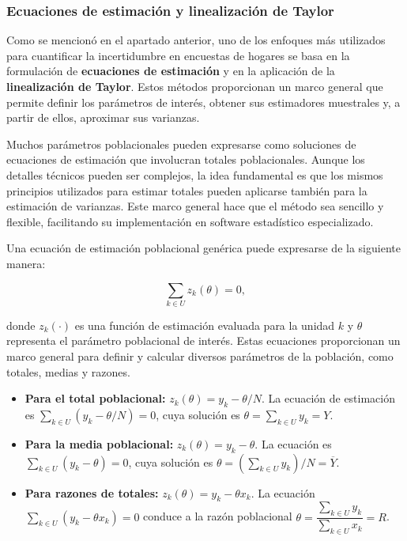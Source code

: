 \documentclass[
  spanish,
  12pt,
]{book}
\begin{document}
\subsubsection*{Ecuaciones de estimación y linealización de Taylor}\label{ecuaciones-de-estimaciuxf3n-y-linealizaciuxf3n-de-taylor}

Como se mencionó en el apartado anterior, uno de los enfoques más utilizados para cuantificar la incertidumbre en encuestas de hogares se basa en la formulación de \textbf{ecuaciones de estimación} y en la aplicación de la \textbf{linealización de Taylor}. Estos métodos proporcionan un marco general que permite definir los parámetros de interés, obtener sus estimadores muestrales y, a partir de ellos, aproximar sus varianzas.

Muchos parámetros poblacionales pueden expresarse como soluciones de ecuaciones de estimación que involucran totales poblacionales. Aunque los detalles técnicos pueden ser complejos, la idea fundamental es que los mismos principios utilizados para estimar totales pueden aplicarse también para la estimación de varianzas. Este marco general hace que el método sea sencillo y flexible, facilitando su implementación en software estadístico especializado.

Una ecuación de estimación poblacional genérica puede expresarse de la siguiente manera:

\[
\sum_{k\in U} z_k(\theta)=0,
\]

donde \(z_k(\cdot)\) es una función de estimación evaluada para la unidad \(k\) y \(\theta\) representa el parámetro poblacional de interés. Estas ecuaciones proporcionan un marco general para definir y calcular diversos parámetros de la población, como totales, medias y razones.

\begin{itemize}
\item
  \textbf{Para el total poblacional:}
  \(z_k(\theta)=y_k-\theta/N\). La ecuación de estimación es \(\sum_{k\in U}(y_k-\theta/N)=0\), cuya solución es \(\theta=\sum_{k\in U} y_k = Y\).
\item
  \textbf{Para la media poblacional:}
  \(z_k(\theta)=y_k-\theta\). La ecuación es \(\sum_{k\in U}(y_k-\theta)=0\), cuya solución es \(\theta=\left(\sum_{k\in U} y_k\right)/N = \overline{Y}\).
\item
  \textbf{Para razones de totales:}
  \(z_k(\theta)=y_k-\theta x_k\). La ecuación \(\sum_{k\in U}(y_k-\theta x_k)=0\) conduce a la razón poblacional \(\theta=\dfrac{\sum_{k\in U} y_k}{\sum_{k\in U} x_k} = R\).
\end{itemize}
\end{document}
